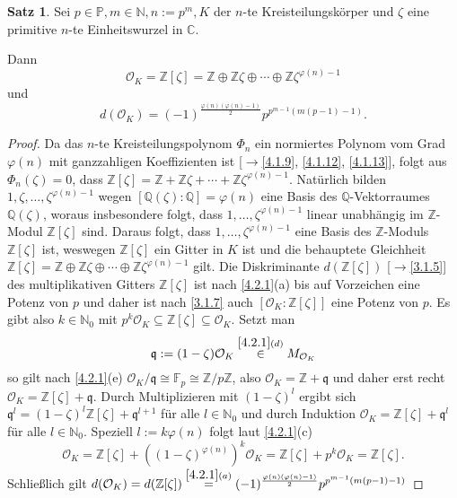 \documentclass[
twoside=semi,
fontsize=12,
DIV=12, 
cleardoublepage=current,
leqno,
headings=optiontoheadandtoc, 
toc=idx
]{scrbook}
\newcommand{\N}{\mathbb{N}}
\newcommand{\Z}{\mathbb{Z}}
\newcommand{\Q}{\mathbb{Q}}
\newcommand{\C}{\mathbb{C}}
\newcommand{\F}{\mathbb{F}}
\renewcommand{\P}{\mathbb{P}}
\theoremstyle{definition}
\newtheorem{satz}[definition]{Satz}
\begin{document}
 	\begin{satz}\label{4.2.2}\hfill\newline
 		Sei $p \in \P, m \in \N, n:= p^m, K$ der $n$-te Kreisteilungsk\"orper und $\zeta$ eine primitive $n$-te Einheitswurzel in $\C$. 
 		
 		\medskip\noindent
 		Dann
 			\[\mathcal{O}_K = \Z[\zeta] = \Z\oplus\Z\zeta\oplus\cdots \oplus\Z\zeta^{\varphi(n)-1}\]
 		und
 			\[d(\mathcal{O}_K) = (-1)^{\frac{\varphi(n)(\varphi(n)-1)}{2}}p^{p^{m-1}(m(p-1)-1)}.\]
 			
 		\begin{proof}
 			Da das $n$-te Kreisteilungspolynom $\Phi_n$ ein normiertes Polynom vom Grad $\varphi(n)$ mit ganzzahligen Koeffizienten ist [$\to$\ref{4.1.9}, \ref{4.1.12}, \ref{4.1.13}],
 			folgt aus $\Phi_n(\zeta) = 0$, dass $\Z[\zeta] = \Z+\Z\zeta+\cdots+\Z\zeta^{\varphi(n)-1}$. Nat\"urlich bilden $1,\zeta,\dots, \zeta^{\varphi(n)-1}$ wegen $[\Q(\zeta):\Q] = \varphi(n)$
 			eine Basis des $\Q$-Vektorraumes $\Q(\zeta)$, woraus insbesondere folgt, dass $1, \dots, \zeta^{\varphi(n)-1}$ linear unabh\"angig im $\Z$-Modul $\Z[\zeta]$ sind. Daraus folgt, dass
 			$1, \dots, \zeta^{\varphi(n)-1}$ eine Basis des $\Z$-Moduls $\Z[\zeta]$ ist, weswegen $\Z[\zeta]$ ein Gitter in $K$ ist und die behauptete Gleichheit $\Z[\zeta] = \Z\oplus\Z\zeta\oplus\cdots \oplus\Z\zeta^{\varphi(n)-1}$ gilt. Die Diskriminante $d(\Z[\zeta])$ [$\to$\ref{3.1.5}] des multiplikativen Gitters $\Z[\zeta]$ ist nach \ref{4.2.1}(a) bis auf Vorzeichen eine Potenz von $p$ und daher ist nach \ref{3.1.7} auch $[\mathcal{O}_K:\Z[\zeta]]$ eine Potenz von $p$. Es gibt also $k \in \N_0$ mit $p^k\mathcal{O}_K \subseteq \Z[\zeta] \subseteq \mathcal{O}_K$.
 			Setzt man
 				\[\mathfrak{q}:=(1-\zeta)\mathcal{O}_K \overset{\ref{4.2.1}(d)}{\in} M_{\mathcal{O}_K}\]
 			so gilt nach \ref{4.2.1}(e) $\mathcal{O}_K/\mathfrak{q} \cong \F_p \cong \Z/p\Z$, also $\mathcal{O}_K = \Z + \mathfrak{q}$ und daher erst recht $\mathcal{O}_K = \Z[\zeta] + \mathfrak{q}$.
 			Durch Multiplizieren mit $(1-\zeta)^l$ ergibt sich $\mathfrak{q}^l = (1-\zeta)^l\Z[\zeta] + \mathfrak{q}^{l+1}$ f\"ur alle $l \in \N_0$ und durch Induktion $\mathcal{O}_K = \Z[\zeta] + \mathfrak{q}^l$ f\"ur alle $l \in \N_0$. Speziell $l:= k\varphi(n)$ folgt laut \ref{4.2.1}(c)
 				\[\mathcal{O}_K = \Z[\zeta] + ((1-\zeta)^{\varphi(n)})^k\mathcal{O}_K = \Z[\zeta] +p^k\mathcal{O}_K = \Z[\zeta].\]
 			Schlie\ss lich gilt $d(\mathcal{O}_K) = d(\Z[\zeta]) \overset{\ref{4.2.1}(a)}{=} (-1)^{\frac{\varphi(n)(\varphi(n)-1)}{2}}p^{p^{m-1}(m(p-1) -1)}$
 		\end{proof}
 	\end{satz}
 
\end{document}
